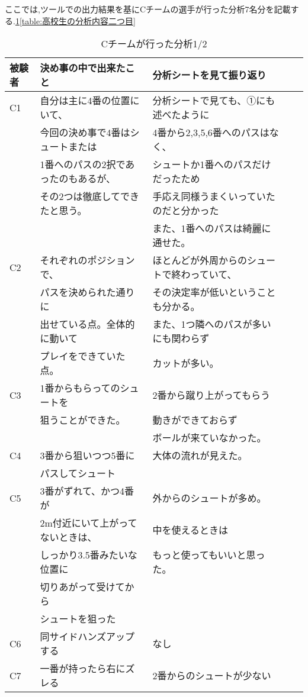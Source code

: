 \documentclass[../main.tex]{subfiles}
\begin{document}
ここでは,ツールでの出力結果を基にCチームの選手が行った分析7名分を記載する.\ref{table:高校生の分析内容一つ目}\ref{table:高校生の分析内容二つ目}


\begin{table}[h]
  \caption{Cチームが行った分析1/2}\label{table:高校生の分析内容一つ目}
  \centering
  \begin{tabular}{lllll}
    \hline \hline
    被験者 & 決め事の中で出来たこと & 分析シートを見て振り返り	 \\
    \hline \hline
    C1&自分は主に4番の位置にいて、&分析シートで見ても、①にも述べたように\\
    &今回の決め事で4番はシュートまたは& 4番から2,3,5,6番へのパスはなく、\\
    &1番へのパスの2択であったのもあるが、&シュートか1番へのパスだけだったため\\
    &その2つは徹底してできたと思う。&手応え同様うまくいっていたのだと分かった\\
    &&また、1番へのパスは綺麗に通せた。\\
    C2&それぞれのポジションで、&ほとんどが外周からのシュートで終わっていて、\\
    &パスを決められた通りに&その決定率が低いということも分かる。\\
    &出せている点。全体的に動いて&また、1つ隣へのパスが多いにも関わらず\\
    &プレイをできていた点。&カットが多い。\\
    C3&1番からもらってのシュートを&2番から蹴り上がってもらう\\
    &狙うことができた。&動きができておらず\\
    &&ボールが来ていなかった。\\
    C4&3番から狙いつつ5番に&大体の流れが見えた。\\
    &パスしてシュート&\\
    C5&3番がずれて、かつ4番が&外からのシュートが多め。\\
    &2m付近にいて上がってないときは、&中を使えるときは\\
    &しっかり3.5番みたいな位置に&もっと使ってもいいと思った。\\
    &切りあがって受けてから&\\
    &シュートを狙った&\\
    C6&同サイドハンズアップする&なし\\
    C7&一番が持ったら右にズレる&2番からのシュートが少ない\\
    \hline
  \end{tabular}
  \end{table}
\end{document}
